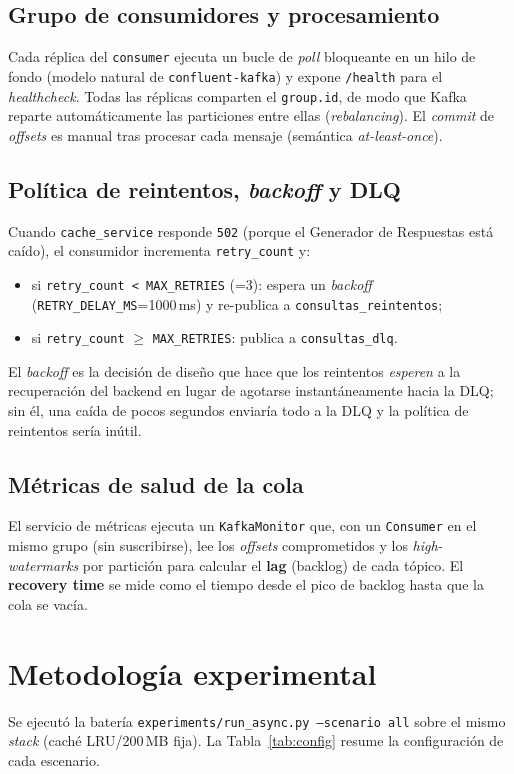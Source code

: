 \documentclass[11pt,a4paper]{article}
\begin{document}
\subsection{Grupo de consumidores y procesamiento}
Cada réplica del \texttt{consumer} ejecuta un bucle de \emph{poll} bloqueante en
un hilo de fondo (modelo natural de \texttt{confluent-kafka}) y expone
\texttt{/health} para el \emph{healthcheck}. Todas las réplicas comparten el
\texttt{group.id}, de modo que Kafka reparte automáticamente las particiones
entre ellas (\emph{rebalancing}). El \emph{commit} de \emph{offsets} es manual
tras procesar cada mensaje (semántica \emph{at-least-once}).

\subsection{Política de reintentos, \emph{backoff} y DLQ}
Cuando \texttt{cache\_service} responde \texttt{502} (porque el Generador de
Respuestas está caído), el consumidor incrementa \texttt{retry\_count} y:
\begin{itemize}[noitemsep]
  \item si \texttt{retry\_count < MAX\_RETRIES} (=3): espera un \emph{backoff}
        (\texttt{RETRY\_DELAY\_MS}=1000\,ms) y re-publica a
        \texttt{consultas\_reintentos};
  \item si \texttt{retry\_count} $\ge$ \texttt{MAX\_RETRIES}: publica a
        \texttt{consultas\_dlq}.
\end{itemize}
El \emph{backoff} es la decisión de diseño que hace que los reintentos
\emph{esperen} a la recuperación del backend en lugar de agotarse
instantáneamente hacia la DLQ; sin él, una caída de pocos segundos enviaría
todo a la DLQ y la política de reintentos sería inútil.

\subsection{Métricas de salud de la cola}
El servicio de métricas ejecuta un \texttt{KafkaMonitor} que, con un
\texttt{Consumer} en el mismo grupo (sin suscribirse), lee los \emph{offsets}
comprometidos y los \emph{high-watermarks} por partición para calcular el
\textbf{lag} (backlog) de cada tópico. El \textbf{recovery time} se mide como el
tiempo desde el pico de backlog hasta que la cola se vacía.

\section{Metodología experimental}
Se ejecutó la batería \texttt{experiments/run\_async.py --scenario all} sobre el
mismo \emph{stack} (caché LRU/200\,MB fija). La Tabla~\ref{tab:config} resume la
configuración de cada escenario.
\end{document}
